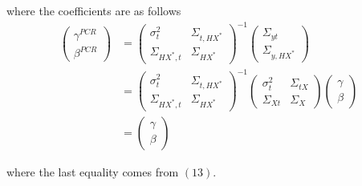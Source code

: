 \documentclass[10pt]{article}
\begin{document}
        where the coefficients are as follows
        \begin{align}
            \left(\begin{array}{l}
        {\gamma}^{PCR} \\
        {\beta}^{PCR}
        \end{array}\right)&=\left(\begin{array}{cc}
        {\sigma}^2_{t} & \Sigma_{t,HX^*} \\
        \Sigma_{HX^*,t} & {\Sigma}_{HX^*}
        \end{array}\right)^{-1}\left(\begin{array}{c}
        \Sigma_{yt} \\
        \Sigma_{y,HX^*}
        \end{array}\right)\\
        &=\left(\begin{array}{cc}
        {\sigma}^2_{t} & \Sigma_{t,HX^*} \\
        \Sigma_{HX^*,t} & {\Sigma}_{HX^*}
        \end{array}\right)^{-1}\left(\begin{array}{cc}
        {\sigma}^2_{t} & \Sigma_{tX} \\
        \Sigma_{Xt} & {\Sigma}_{X}
        \end{array}\right)\left(\begin{array}{l}
        {\gamma} \\
        {\beta}
        \end{array}\right)\\
        &=\left(\begin{array}{l}
        {\gamma} \\
        {\beta}
        \end{array}\right)
        \end{align}
        
        where the last equality comes from $(13)$.\\
        
\end{document}
